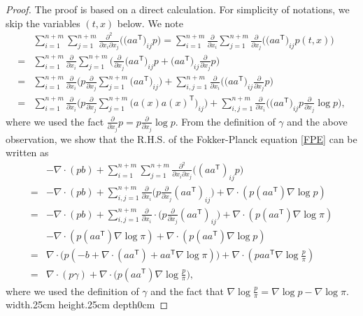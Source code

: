 \documentclass[11pt,reqno]{amsart}
\newcommand{\ts}{\mathsf{T}}
\def\qed{ \hfill \vrule width.25cm height.25cm depth0cm\smallskip}
\begin{document}
\begin{proof}
The proof is based on a direct calculation. For simplicity of notations, we skip the variables $(t,x)$ below. We note
\begin{equation*}
\begin{aligned}
   &\sum_{i=1}^{n+m}\sum_{j=1}^{n+m}\frac{\partial^2}{\partial x_i\partial x_j} \Big(\Big(aa^{\ts}\Big)_{ij}p\Big)
      =\sum_{i=1}^{n+m}\frac{\partial}{\partial x_i}\sum_{j=1}^{n+m}\frac{\partial}{\partial x_j}\Big(\Big(aa^{\ts}\Big)_{ij}p(t,x)\Big)\\
            =&\sum_{i=1}^{n+m}\frac{\partial}{\partial x_i}\sum_{j=1}^{n+m}\Big(\frac{\partial}{\partial x_j}\Big(aa^{\ts}\Big)_{ij}p+\Big(aa^{\ts}\Big)_{ij}\frac{\partial}{\partial x_j}p\Big)\\
 =&\sum_{i=1}^{n+m}\frac{\partial}{\partial x_i}\Big(p\frac{\partial}{\partial x_j}\sum_{j=1}^{n+m}\Big(aa^{\ts}\Big)_{ij}\Big)+\sum_{i,j=1}^{n+m}\frac{\partial}{\partial x_i}\Big(\Big(aa^{\ts}\Big)_{ij}\frac{\partial}{\partial x_j}p\Big)\\
 =&\sum_{i=1}^{n+m}\frac{\partial}{\partial x_i}\Big(p\frac{\partial}{\partial x_j}\sum_{j=1}^{n+m}\Big(a(x)a(x)^{\ts}\Big)_{ij}\Big)+\sum_{i,j=1}^{n+m}\frac{\partial}{\partial x_i}\Big(\Big(aa^{\ts}\Big)_{ij}p\frac{\partial}{\partial x_j}\log p\Big),
\end{aligned}
\end{equation*}
where we used the fact $\frac{\partial}{\partial x_j}p=p\frac{\partial}{\partial x_j}\log p$. From the definition of $\gamma$ and the above observation, we show that the R.H.S. of the Fokker-Planck equation \eqref{FPE} can be written as 
\begin{equation*}
   \begin{aligned}
&-\nabla\cdot(pb)+\sum_{i=1}^{n+m}\sum_{j=1}^{n+m}\frac{\partial^2}{\partial x_i\partial x_j} \Big((aa^{\ts})_{ij}p\Big)\\
=&-\nabla\cdot(p b)+\sum_{i,j=1}^{n+m}\frac{\partial}{\partial x_i}\Big(p\frac{\partial}{\partial x_j}(aa^{\ts})_{ij}\Big)+\nabla\cdot(p(aa^{\ts})\nabla\log p)\\
=&-\nabla\cdot(p b)+\sum_{i,j=1}^{n+m}\frac{\partial}{\partial x_i}\cdot\Big(p\frac{\partial}{\partial x_j}(aa^{\ts})_{ij}\Big)+\nabla\cdot(p(aa^{\ts})\nabla\log\pi)\\
&-\nabla\cdot(p(aa^{\ts})\nabla\log\pi)+\nabla\cdot(p(aa^{\ts})\nabla\log p)\\
=&\nabla\cdot\Big(p (-b+\nabla\cdot(aa^{\ts})+aa^{\ts}\nabla\log\pi)\Big) +\nabla\cdot(paa^{\ts}\nabla\log\frac{p}{\pi})\\
=&\nabla\cdot(p \gamma) +\nabla\cdot\Big(p(aa^{\ts})\nabla\log\frac{p}{\pi}\Big),
\end{aligned}
\end{equation*}
where we used the definition of $\gamma$ and the fact that $\nabla\log\frac{p}{\pi}=\nabla\log p-\nabla\log \pi$. 
  \qed 
\end{proof}
\end{document}
